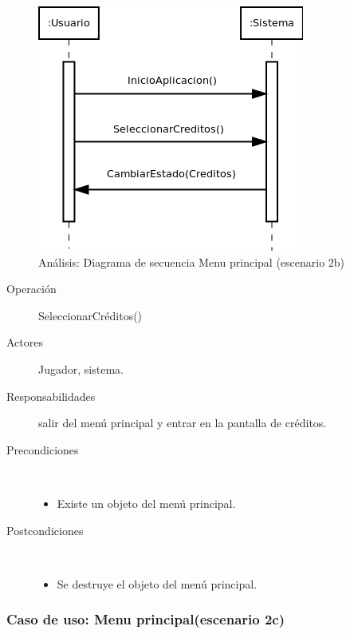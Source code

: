 \begin{figure}[H] 
  \label{secuencia_menu_principal3}
  \begin{center}
    \includegraphics[scale=0.6]{imagenes/analisis/secuencia_menu_principal3.png}
  \end{center}
  \caption{Análisis: Diagrama de secuencia Menu principal (escenario 2b)}
\end{figure}

\begin{description}
    \item [Operación] SeleccionarCréditos()
    \item [Actores] Jugador, sistema.
    \item [Responsabilidades] salir del menú principal y entrar en la pantalla de créditos.
    \item [Precondiciones] $\quad$
        \begin{itemize}
            \item Existe un objeto del menú principal.
        \end{itemize}
    \item [Postcondiciones] $\quad$
        \begin{itemize}
            \item Se destruye el objeto del menú principal.
        \end{itemize}
\end{description}

\subsubsection{Caso de uso: Menu principal(escenario 2c)}


